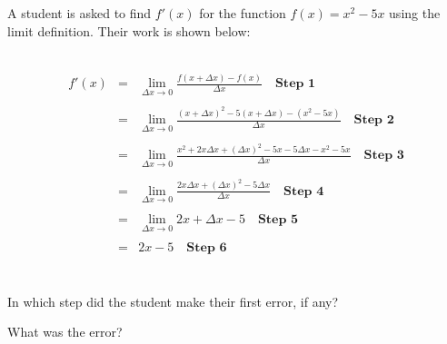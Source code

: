 \documentclass{ximera}
\begin{document}
\begin{problem}
A student is asked to find $f'(x)$ for the function $f(x) = x^2 - 5x$ using the limit definition.  Their work is shown below:

~ \\[0.5em]

\begin{eqnarray*}
    f'(x) &=& \lim_{\Delta x \rightarrow 0} \frac{f(x+\Delta x) - f(x)}{\Delta x} \quad \textbf{Step 1}  \\
    & & \\
    &=& \lim_{\Delta x \rightarrow 0} \frac{(x+\Delta x)^2 - 5(x+\Delta x) - (x^2 - 5x)}{\Delta x} \quad \textbf{Step 2} \\
    & & \\
    &=& \lim_{\Delta x \rightarrow 0} \frac{x^2 + 2x\Delta x + (\Delta x)^2 - 5x - 5\Delta x - x^2 - 5x}{\Delta x} \quad \textbf{Step 3} \\
    & & \\
    &=& \lim_{\Delta x \rightarrow 0} \frac{2x \Delta x + (\Delta x)^2 - 5 \Delta x}{\Delta x} \quad \textbf{Step 4} \\
    & & \\
    &=& \lim_{\Delta x \rightarrow 0} 2x + \Delta x - 5 \quad \textbf{Step 5} \\
    & & \\
    &=& 2x - 5 \quad \textbf{Step 6} \\
\end{eqnarray*}

~ \\[2em]

In which step did the student make their first error, if any?
\begin{multipleChoice}
\end{multipleChoice}

\begin{problem}
What was the error?

~ \\[2em]

    \begin{multipleChoice}
\end{multipleChoice}


\end{problem}
\end{problem}
\end{document}
